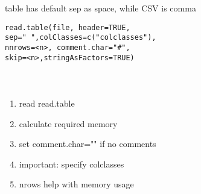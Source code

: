 \documentclass[12pt,a4paper]{report}
\begin{document}
\begin{tcolorbox}[colback=pageyl,colframe=pagebl,title= R  \hfill Reading Table,coltitle=Magenta,fonttitle=\bfseries,coltext=Black,width=0.9\paperwidth,boxrule=2mm]\colorbox{pageyl}{\noindent\begin{minipage}[t]{0.3\textwidth}\sffamily \color{ctnb}\vspace{\baselineskip}
table has default sep as space, while CSV is comma
\end{minipage}}\qquad\begin{minipage}[t]{0.672\textwidth}
{\begin{lstlisting}[frame=single,framerule=0pt, numbers=none, numbersep=10pt, aboveskip=20pt,belowskip=20pt]
read.table(file, header=TRUE, 
sep=" ",colClasses=c("colclasses"),
nnrows=<n>, comment.char="#",
skip=<n>,stringAsFactors=TRUE)
\end{lstlisting}}\end{minipage}\end{tcolorbox}


\newpage
\paragraph{\color{RoyalBlue}{Optimizing reading large datasets}\\}
\begin{enumerate}
\item read read.table \\
\item calculate required memory \\
\item set comment.char="" if no comments \\
\item important: specify colclasses \\
\item nrows help with memory usage
\end{enumerate} 
\end{document}
